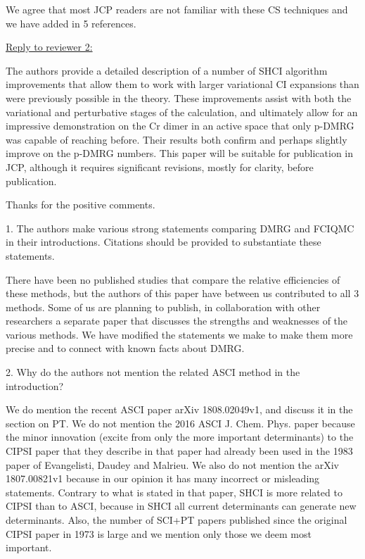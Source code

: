 \documentclass[
preprint,
onecolumn,
 superscriptaddress,
 amsmath,amssymb,
 aps,
]{revtex4-1}
\begin{document}
We agree that most JCP readers are not familiar with these CS techniques and we have added in
5 references.

\vskip 8mm
\noindent\underline{Reply to reviewer 2:}

\vskip 5mm {\color{blue}
The authors provide a detailed description of a number of SHCI algorithm improvements that
allow them to work with larger variational CI expansions than were previously possible in the
theory. These improvements assist with both the variational and perturbative stages of the
calculation, and ultimately allow for an impressive demonstration on the Cr dimer in an active
space that only p-DMRG was capable of reaching before. Their results both confirm and perhaps
slightly improve on the p-DMRG numbers. This paper will be suitable for publication in JCP,
although it requires significant revisions, mostly for clarity, before publication.
}\color{black}

Thanks for the positive comments.

\vskip 5mm {\color{blue}
1. The authors make various strong statements comparing DMRG and FCIQMC in their
introductions. Citations should be provided to substantiate these statements.
}\color{black}

There have been no published studies that compare the relative efficiencies of these methods,
but the authors of this paper have
between us contributed to all 3 methods.  Some of us are planning to publish, in collaboration
with other researchers a separate paper that discusses the strengths and weaknesses
of the various methods.  We have modified the statements we make to make them more precise
and to connect with known facts about DMRG.

\vskip 5mm {\color{blue}
2. Why do the authors not mention the related ASCI method in the introduction?
}\color{black}

We do mention the recent ASCI paper arXiv 1808.02049v1, and discuss it in the section on PT.
We do not mention the 2016 ASCI J. Chem. Phys. paper because the minor innovation (excite from
only the more important determinants) to the CIPSI paper that they
describe in that paper had already been used in the 1983 paper of Evangelisti, Daudey and Malrieu.
We also do not mention the arXiv 1807.00821v1 because in our opinion it has many incorrect or
misleading statements.  Contrary to what is stated in that paper, SHCI is more related to CIPSI
than to ASCI, because in SHCI all current determinants can generate new determinants.
Also, the number of SCI+PT papers published since the original CIPSI paper in 1973 is large and we
mention only those we deem most important.
\end{document}
